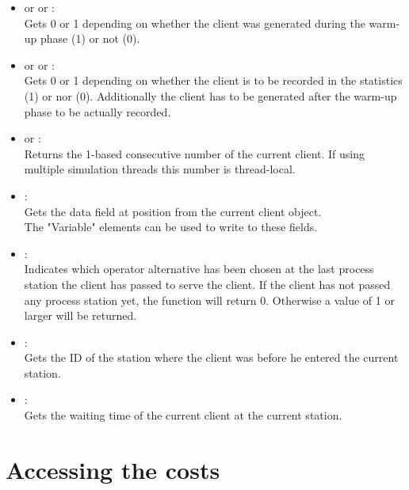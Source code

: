 \begin{itemize}

\item
{} or  or :\\
Gets 0 or 1 depending on whether the client was generated during the warm-up phase (1) or not (0).

\item
{} or  or :\\
Gets 0 or 1 depending on whether the client is to be recorded in the statistics (1) or nor (0). Additionally the client has to be generated after the warm-up phase to be actually recorded.

\item
{} or :\\
Returns the 1-based consecutive number of the current client. If using multiple simulation threads this number is thread-local.

\item
{}:\\
Gets the data field at position  from the current client object.\\
The "Variable" elements can be used to write to these fields.

\item
{}:\\
Indicates which operator alternative has been chosen at the last process station the client has passed to serve the client. If the client has not passed any process station yet, the function will return 0. Otherwise a value of 1 or larger will be returned.

\item
{}:\\
Gets the ID of the station where the client was before he entered the current station.

\item
{}:\\
Gets the waiting time of the current client at the current station.

\end{itemize}



\section{Accessing the costs}

